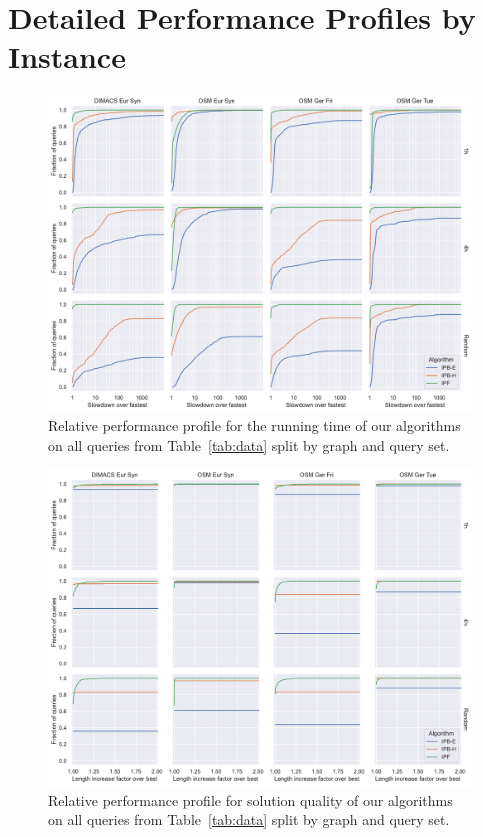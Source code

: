\documentclass[a4paper,UKenglish,cleveref, autoref, thm-restate]{lipics-v2021}
\begin{document}




\appendix

\section{Detailed Performance Profiles by Instance}\label{sec:perf_profile_instance}

\begin{figure}[t]
\centering
\includegraphics[width=.935\linewidth]{fig/detailed_perf_profile_time.pdf}
\caption{
Relative performance profile for the running time of our algorithms on all queries from Table~\ref{tab:data} split by graph and query set.
}\label{fig:perf_profile_time}
\end{figure}

\begin{figure}[t]
\centering
\includegraphics[width=.935\linewidth]{fig/detailed_perf_profile_quality.pdf}
\caption{
Relative performance profile for solution quality of our algorithms on all queries from Table~\ref{tab:data} split by graph and query set.
}\label{fig:perf_profile_quality}
\end{figure}
\end{document}
